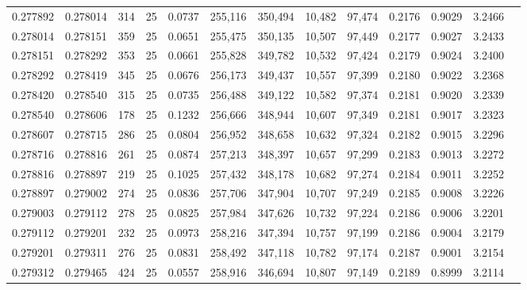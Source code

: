 \begin{tabular}{rrrrrrrrrrrrr}
0.277892 & 0.278014 &   314 &  25 &                                     0.0737 & 255,116 & 350,494 &  10,482 &  97,474 & 0.2176 & 0.9029 & 3.2466 \\
0.278014 & 0.278151 &   359 &  25 &                                     0.0651 & 255,475 & 350,135 &  10,507 &  97,449 & 0.2177 & 0.9027 & 3.2433 \\
0.278151 & 0.278292 &   353 &  25 &                                     0.0661 & 255,828 & 349,782 &  10,532 &  97,424 & 0.2179 & 0.9024 & 3.2400 \\
0.278292 & 0.278419 &   345 &  25 &                                     0.0676 & 256,173 & 349,437 &  10,557 &  97,399 & 0.2180 & 0.9022 & 3.2368 \\
0.278420 & 0.278540 &   315 &  25 &                                     0.0735 & 256,488 & 349,122 &  10,582 &  97,374 & 0.2181 & 0.9020 & 3.2339 \\
0.278540 & 0.278606 &   178 &  25 &                                     0.1232 & 256,666 & 348,944 &  10,607 &  97,349 & 0.2181 & 0.9017 & 3.2323 \\
0.278607 & 0.278715 &   286 &  25 &                                     0.0804 & 256,952 & 348,658 &  10,632 &  97,324 & 0.2182 & 0.9015 & 3.2296 \\
0.278716 & 0.278816 &   261 &  25 &                                     0.0874 & 257,213 & 348,397 &  10,657 &  97,299 & 0.2183 & 0.9013 & 3.2272 \\
0.278816 & 0.278897 &   219 &  25 &                                     0.1025 & 257,432 & 348,178 &  10,682 &  97,274 & 0.2184 & 0.9011 & 3.2252 \\
0.278897 & 0.279002 &   274 &  25 &                                     0.0836 & 257,706 & 347,904 &  10,707 &  97,249 & 0.2185 & 0.9008 & 3.2226 \\
0.279003 & 0.279112 &   278 &  25 &                                     0.0825 & 257,984 & 347,626 &  10,732 &  97,224 & 0.2186 & 0.9006 & 3.2201 \\
0.279112 & 0.279201 &   232 &  25 &                                     0.0973 & 258,216 & 347,394 &  10,757 &  97,199 & 0.2186 & 0.9004 & 3.2179 \\
0.279201 & 0.279311 &   276 &  25 &                                     0.0831 & 258,492 & 347,118 &  10,782 &  97,174 & 0.2187 & 0.9001 & 3.2154 \\
0.279312 & 0.279465 &   424 &  25 &                                     0.0557 & 258,916 & 346,694 &  10,807 &  97,149 & 0.2189 & 0.8999 & 3.2114 \\

\end{tabular}
